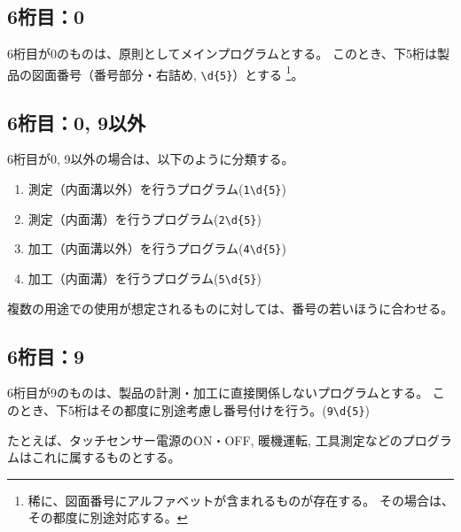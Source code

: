 \subsection{6桁目：0}
6桁目が0のものは、原則としてメインプログラムとする。
このとき、下5桁は製品の図面番号（番号部分・右詰め, \verb|\d{5}|）とする
\footnote{稀に、図面番号にアルファベットが含まれるものが存在する。
その場合は、その都度に別途対応する。}。

\subsection{6桁目：0, 9以外}
6桁目が0, 9以外の場合は、以下のように分類する。
\begin{enumerate}[label=\arabic*., ref=\arabic*, start=1]
\item\label{item:6Mmain} 測定（内面溝以外）を行うプログラム(\verb|1\d{5}|)
\item\label{item:6MD} 測定（内面溝）を行うプログラム(\verb|2\d{5}|)
\setcounter{enumi}{3}
\item\label{item:6Kmain} 加工（内面溝以外）を行うプログラム(\verb|4\d{5}|)
\item\label{item:6KD} 加工（内面溝）を行うプログラム(\verb|5\d{5}|)
\end{enumerate}
複数の用途での使用が想定されるものに対しては、番号の若いほうに合わせる。


\subsection{6桁目：9}
6桁目が9のものは、製品の計測・加工に直接関係しないプログラムとする。
このとき、下5桁はその都度に別途考慮し番号付けを行う。(\verb|9\d{5}|)
\begin{hosoku}
たとえば、タッチセンサー電源のON・OFF, 暖機運転, 工具測定などのプログラムはこれに属するものとする。
\end{hosoku}


